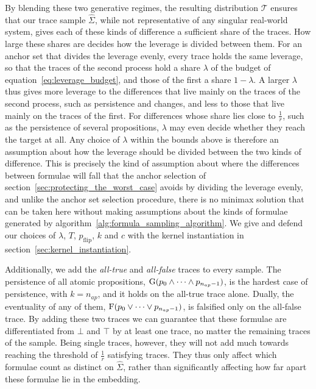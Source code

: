 \documentclass[titlepage,a4paper,11pt]{report}
\begin{document}
    By blending these two generative regimes, the resulting distribution $\mathcal{T}$ ensures that our trace sample $\widehat \Sigma$, while not representative of any singular real-world system, gives each of these kinds of difference a sufficient share of the traces. How large these shares are decides how the leverage is divided between them. For an anchor set that divides the leverage evenly, every trace holds the same leverage, so that the traces of the second process hold a share $\lambda$ of the budget of equation~\eqref{eq:leverage_budget}, and those of the first a share $1-\lambda$. A larger $\lambda$ thus gives more leverage to the differences that live mainly on the traces of the second process, such as persistence and changes, and less to those that live mainly on the traces of the first. For differences whose share lies close to $\frac1r$, such as the persistence of several propositions, $\lambda$ may even decide whether they reach the target at all. Any choice of $\lambda$ within the bounds above is therefore an assumption about how the leverage should be divided between the two kinds of difference. This is precisely the kind of assumption about where the differences between formulae will fall that the anchor selection of section~\ref{sec:protecting_the_worst_case} avoids by dividing the leverage evenly, and unlike the anchor set selection procedure, there is no minimax solution that can be taken here without making assumptions about the kinds of formulae generated by algorithm~\ref{alg:formula_sampling_algorithm}. We give and defend our choices of $\lambda$, $T$, $p_{\text{flip}}$, $k$ and $c$ with the kernel instantiation in section~\ref{sec:kernel_instantiation}.
 
    Additionally, we add the \textit{all-true} and \textit{all-false} traces to every sample. The persistence of all atomic propositions, $\text{G}(p_0\land\dots\land p_{n_{ap}-1})$, is the hardest case of persistence, with $k=n_{ap}$, and it holds on the all-true trace alone. Dually, the eventuality of any of them, $\text{F}(p_0\lor\dots\lor p_{n_{ap}-1})$, is falsified only on the all-false trace. By adding these two traces we can guarantee that these formulae are differentiated from $\bot$ and $\top$ by at least one trace, no matter the remaining traces of the sample. Being single traces, however, they will not add much towards reaching the threshold of $\frac1r$ satisfying traces. They thus only affect which formulae count as distinct on $\widehat\Sigma$, rather than significantly affecting how far apart these formulae lie in the embedding.
 
\end{document}
